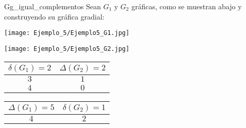 \documentclass[fleqn, 11pt]{beamer}
\begin{document}
    \begin{ejemplo}[breakable, pad at break = 4mm, beforeafter skip = 4mm]{}{Gg_igual_complementos}
        Sean $ G_1 $ y $ G_2 $ gráficas, como se muestran abajo y construyendo su gráfica gradial: \vspace{2mm}

        \begin{center}
            \begin{minipage}[h]{0.6\linewidth}
                \begin{minipage}[h]{0.45\linewidth}
                    \texttt{[image: Ejemplo\_5/Ejemplo5\_G1.jpg]}
                \end{minipage} 
                \begin{minipage}[h]{0.45\linewidth}
                    \texttt{[image: Ejemplo\_5/Ejemplo5\_G2.jpg]}
                \end{minipage} 
    
                \begin{minipage}[h]{0.45\linewidth}
                    \begin{tcolorbox}[title empty, colframe = black!99!white, colback = white, sharp corners, hbox, nobeforeafter, left = -0.9mm, right = -0.9mm, top = -0.9mm, bottom = -0.9mm]
                        \begin{tabular}{c|c}
                            \rowcolor{gray!36!white} 
                            $ \delta(G_1) = 2 $ & $ \Delta(G_2) = 2 $ \\ \hline \hline
                            $ 3 $               & $ 1 $ \\ \hline
                            $ 4 $               & $ 0 $
                        \end{tabular}
                    \end{tcolorbox}
                \end{minipage}
                \begin{minipage}[h]{0.45\linewidth}
                    \begin{tcolorbox}[title empty, colframe = black!99!white, colback = white, sharp corners, hbox, nobeforeafter, left = -0.9mm, right = -0.9mm, top = -0.9mm, bottom = -0.9mm]
                        \begin{tabular}{c|c}
                            \rowcolor{gray!36!white} 
                            $ \Delta(G_1) = 5 $ & $ \delta(G_2) = 1 $ \\ \hline \hline
                            $ 4 $               & $ 2 $
                        \end{tabular}
                    \end{tcolorbox}
                \end{minipage}
            \end{minipage}
            \begin{minipage}[h]{0.25\linewidth}
                \centering
                

\end{minipage}
\end{center}
\end{ejemplo}
\end{document}
